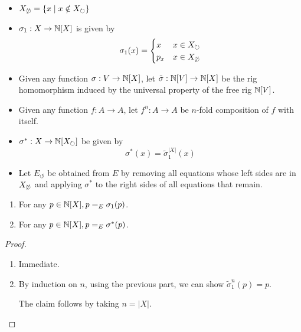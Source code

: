 \documentclass[numbers=enddot]{scrartcl}
\newcommand{\Xcyc}{X_{\circlearrowright}}
\newcommand{\Xacyc}{X_{\not\circlearrowright}}
\begin{document}
\newcommand{\Ecyc}{E_\circlearrowleft}
\begin{notn}
  \begin{itemize}
    \item $\Xacyc = \setof{x \mid x \notin \Xcyc}$
    \item $\sigma_1 : X \to \mathbb{N}[X]$ is given by
    \[\sigma_1(x) = \begin{cases}
          x & x \in \Xcyc\\
          p_x & x \in \Xacyc
        \end{cases} \]
      \item Given any function $\sigma : V \to \mathbb{N}[X]$, let
      $\tilde\sigma : \mathbb{N}[V] \to \mathbb{N}[X]$ be the rig homomorphism
      induced by the universal property of the free rig $\mathbb{N}[V]$.
      \item Given any function $f : A \to A$, let $f^n : A \to A$ be
      $n$-fold composition of $f$ with itself.
    \item $\sigma^* : X \to \nat[\Xcyc]$ be given by
      \[ \sigma^*(x) = \tilde\sigma_1^{|X|}(x) \]
    \item Let $\Ecyc$ be obtained from $E$ by removing all equations
    whose left sides are in $\Xacyc$ and applying $\sigma^*$ to the
    right sides of all equations that remain.
  \end{itemize}
\end{notn}

\begin{prop}\hfill
  \begin{enumerate}
    \item For any $p \in \mathbb{N}[X], p =_E \sigma_1(p)$.
    \item For any $p \in \mathbb{N}[X], p =_E \sigma^*(p)$.
  \end{enumerate}
\end{prop}
\begin{proof}
  \begin{enumerate}
    \item Immediate.
    \item By induction on $n$, using the previous part,
    we can show $\tilde\sigma_1^n(p) = p$.

    The claim follows by taking $n = |X|$. \qedhere
  \end{enumerate}
\end{proof}
\end{document}
